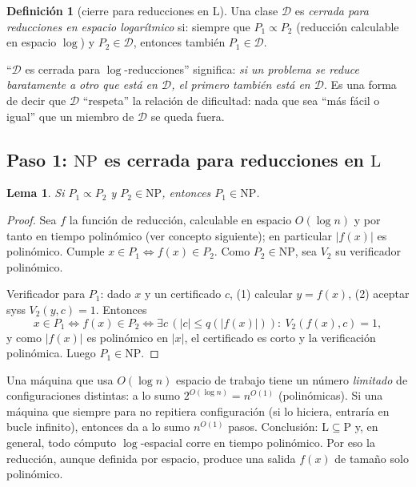 \documentclass[11pt,a4paper]{article}
\theoremstyle{plain}
\newtheorem{lema}{Lema}
\theoremstyle{definition}
\newtheorem{definicion}{Definici\'on}
\newcommand{\NP}{\mathrm{NP}}
\newcommand{\Pclass}{\mathrm{P}}
\newcommand{\Lclass}{\mathrm{L}}
\newcommand{\reduce}{\propto}
\begin{document}
\begin{definicion}[cierre para reducciones en $\Lclass$]
Una clase $\mathcal{D}$ es \emph{cerrada para reducciones en espacio logar\'itmico}
si: siempre que $P_1\reduce P_2$ (reducci\'on calculable en espacio $\log$) y
$P_2\in\mathcal{D}$, entonces tambi\'en $P_1\in\mathcal{D}$.
\end{definicion}

\begin{concepto}
``$\mathcal{D}$ es cerrada para $\log$-reducciones'' significa: \emph{si un problema
se reduce baratamente a otro que est\'a en $\mathcal{D}$, el primero tambi\'en
est\'a en $\mathcal{D}$}. Es una forma de decir que $\mathcal{D}$ ``respeta'' la
relaci\'on de dificultad: nada que sea ``m\'as f\'acil o igual'' que un miembro de
$\mathcal{D}$ se queda fuera.
\end{concepto}

\subsection*{Paso 1: $\NP$ es cerrada para reducciones en $\Lclass$}

\begin{lema}
Si $P_1\reduce P_2$ y $P_2\in\NP$, entonces $P_1\in\NP$.
\end{lema}

\begin{proof}
Sea $f$ la funci\'on de reducci\'on, calculable en espacio $O(\log n)$ y por tanto en
tiempo polin\'omico (ver concepto siguiente); en particular $|f(x)|$ es polin\'omico.
Cumple $x\in P_1\iff f(x)\in P_2$. Como $P_2\in\NP$, sea $V_2$ su verificador
polin\'omico.

Verificador para $P_1$: dado $x$ y un certificado $c$, (1) calcular $y=f(x)$,
(2) aceptar syss $V_2(y,c)=1$. Entonces
\[
x\in P_1 \iff f(x)\in P_2 \iff \exists c\,(|c|\le q(|f(x)|)):\ V_2(f(x),c)=1,
\]
y como $|f(x)|$ es polin\'omico en $|x|$, el certificado es corto y la verificaci\'on
polin\'omica. Luego $P_1\in\NP$.
\end{proof}

\begin{concepto}
Una m\'aquina que usa $O(\log n)$ espacio de trabajo tiene un n\'umero \emph{limitado}
de configuraciones distintas: a lo sumo $2^{O(\log n)}=n^{O(1)}$ (polin\'omicas). Si
una m\'aquina que siempre para no repitiera configuraci\'on (si lo hiciera, entrar\'ia
en bucle infinito), entonces da a lo sumo $n^{O(1)}$ pasos. Conclusi\'on:
$\Lclass\subseteq\Pclass$ y, en general, todo c\'omputo $\log$-espacial corre en
tiempo polin\'omico. Por eso la reducci\'on, aunque definida por espacio, produce una
salida $f(x)$ de tama\~no solo polin\'omico.
\end{concepto}
\end{document}
